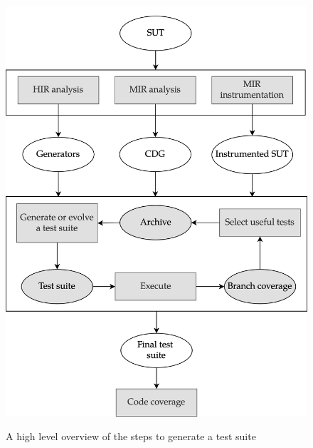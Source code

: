 \documentclass{article}
\begin{document}
\begin{figure}[h]
\caption{A high level overview of the steps to generate a test suite}
\centering
\includegraphics[width=\textwidth]{overview}
\label{fig:overview}
\end{figure}
\end{document}
